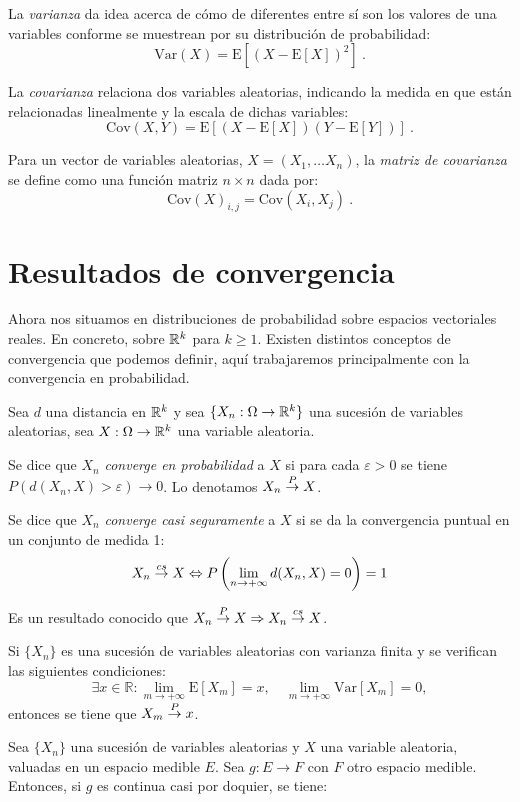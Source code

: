 La \emph{varianza} da idea acerca de cómo de diferentes entre sí son
los valores de una variables conforme se muestrean por su distribución
de probabilidad: \[\mathrm{Var}(X)=\mathrm E[(X-\mathrm E[X])^2]~.\]

La \emph{covarianza} relaciona dos variables aleatorias, indicando la
medida en que están relacionadas linealmente y la escala de dichas
variables:
\[\mathrm{Cov}(X, Y)=\mathrm E[(X-\mathrm E[X])(Y-\mathrm E[Y])]~.\]

Para un vector de variables aleatorias, \(X=(X_1, \dots X_n)\), la
\emph{matriz de covarianza} se define como una función matriz
\(n\times n\) dada por:
\[\mathrm{Cov}(X)_{i,j}=\mathrm{Cov}(X_i, X_j)~.\]

\section{Resultados de convergencia}\label{resultados-de-convergencia}

Ahora nos situamos en distribuciones de probabilidad sobre espacios vectoriales reales. En concreto, sobre $\mathbb{R}^k$ para $k\geq 1$. Existen distintos conceptos de convergencia que podemos definir, aquí trabajaremos principalmente con la convergencia en probabilidad.

Sea \(d\) una distancia en \(\mathbb{R}^k\) y sea
\(\{X_n:\Omega\rightarrow\mathbb{R}^k\}\) una sucesión de variables aleatorias,
sea \(X:\Omega \rightarrow \mathbb{R}^k\) una variable aleatoria.

Se dice que \(X_n\) \emph{converge en probabilidad} a \(X\) si para cada
\(\varepsilon>0\) se tiene \(P(d(X_n, X)>\varepsilon)\rightarrow 0\). Lo
denotamos \(X_n\overset{P}{\rightarrow} X\). 

Se dice que \(X_n\) \emph{converge casi seguramente} a \(X\) si se da la
convergencia puntual en un conjunto de medida 1:
\[X_n\overset{cs}{\rightarrow} X\Leftrightarrow P\left(\lim_{n\rightarrow +\infty} d(X_n, X)=0\right)=1\]

Es un resultado conocido que \(X_n\overset{P}{\rightarrow} X\Rightarrow X_n\overset{cs}{\rightarrow} X\).

\lemmab
\label{lm:convergencia-va} Si \(\{X_n\}\) es una sucesión de variables
aleatorias con varianza finita y se verifican las siguientes
condiciones:
\[\exists x\in \mathbb R:\lim_{m\rightarrow +\infty} \mathrm{E}[X_m]=x,\quad \lim_{m\rightarrow +\infty} \mathrm{Var}[X_m]=0,\]
entonces se tiene que \(X_m\overset{P}{\rightarrow} x\). \lemmae

\label{th:cont-map-conv} Sea \(\{X_n\}\) una sucesión de variables
aleatorias y \(X\) una variable aleatoria, valuadas en un espacio
medible \(E\). Sea \(g:E\rightarrow F\) con \(F\) otro espacio medible.
Entonces, si \(g\) es continua casi por doquier, se tiene:

